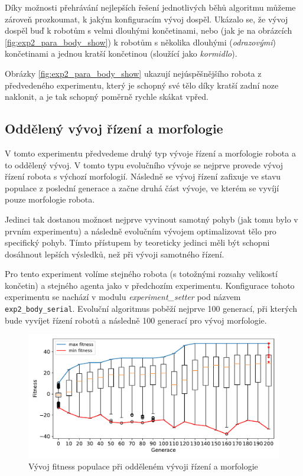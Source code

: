 \pagebreak
Díky možnosti přehrávání nejlepších řešení jednotlivých běhů algoritmu můžeme
zároveň prozkoumat, k jakým konfiguracím vývoj dospěl. Ukázalo se, že vývoj
dospěl buď k robotům s velmi dlouhými končetinami, nebo (jak je na obrázcích
\ref{fig:exp2_para_body_show}) k robotům s několika dlouhými
(\emph{odrazovými}) končetinami a jednou kratší končetinou (sloužící jako
\emph{kormidlo}). 

Obrázky \ref{fig:exp2_para_body_show} ukazují nejúspěšnějšího robota z
předvedeného experimentu, který je schopný své tělo díky kratší zadní noze
naklonit, a je tak schopný poměrně rychle skákat vpřed.

\subsection{Oddělený vývoj řízení a morfologie} \label{exp2:split_evo}

V tomto experimentu předvedeme druhý typ vývoje řízení a morfologie robota a to
oddělený vývoj. V tomto typu evolučního vývoje se nejprve provede vývoj řízení
robota s výchozí morfologií. Následně se vývoj řízení zafixuje ve stavu
populace z poslední generace a začne druhá část vývoje, ve kterém se vyvíjí
pouze morfologie robota.

Jedinci tak dostanou možnost nejprve vyvinout samotný pohyb (jak tomu bylo v
prvním experimentu) a následně evolučním vývojem optimalizovat tělo pro
specifický pohyb. Tímto přístupem by teoreticky jedinci měli být schopni
dosáhnout lepších výsledků, než při vývoji samotného řízení.

Pro tento experiment volíme stejného robota (s totožnými rozsahy velikostí
končetin) a stejného agenta jako v předchozím experimentu. Konfigurace tohoto
experimentu se nachází v modulu \emph{experiment\_setter} pod názvem
\texttt{exp2\_body\_serial}. Evoluční algoritmus poběží nejprve 100 generací,
při kterých bude vyvíjet řízení robotů a následně 100 generací pro vývoj
morfologie.

\begin{figure}[h!]
    \includegraphics[width=1\textwidth]{../img/experiment2_serial_10ticks.pdf}
    \caption{Vývoj fitness populace při odděleném vývoji řízení a morfologie}
    \label{exp:exp2_serial}
\end{figure}

